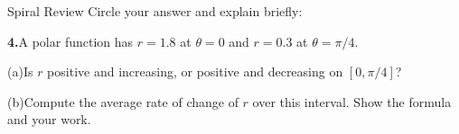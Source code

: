 \documentclass[10pt]{article}
\begin{document}
\begin{notesbox}{Spiral Review}
\vspace{4pt}
Circle your answer and explain briefly: \writeline

\vspace{0.14in}
\textbf{4.}\quad A polar function has $r = 1.8$ at $\theta = 0$ and $r = 0.3$
at $\theta = \pi/4$.

\vspace{4pt}
(a)\quad Is $r$ positive and increasing, or positive and decreasing on $[0, \pi/4]$?
\blank{3.5cm}

\vspace{4pt}
(b)\quad Compute the average rate of change of $r$ over this interval.
Show the formula and your work.

\vspace{4pt}
\blank{8cm}

\end{notesbox}
\end{document}
